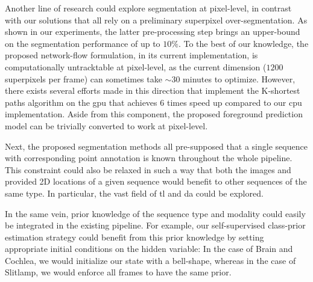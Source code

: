 Another line of research could explore segmentation at pixel-level, in contrast with our solutions that all rely on a preliminary superpixel over-segmentation.
As shown in our experiments, the latter pre-processing step brings an upper-bound on the segmentation performance of up to $10\%$.
To the best of our knowledge, the proposed network-flow formulation, in its current implementation, is computationally untracktable at pixel-level, as the current dimension ($1200$ superpixels per frame) can sometimes take $\sim 30$ minutes to optimize.
However, there exists several efforts made in this direction that implement the K-shortest paths algorithm on the \gls{gpu} that achieves $6$ times speed up compared to our \gls{cpu} implementation.
Aside from this component, the proposed foreground prediction model can be trivially converted to work at pixel-level.

Next, the proposed segmentation methods all pre-supposed that a single sequence with corresponding point annotation is known throughout the whole pipeline.
This constraint could also be relaxed in such a way that both the images and provided 2D locations of a given sequence would benefit to other sequences of the same type.
In particular, the vast field of \gls{tl} and \gls{da} could be explored.

In the same vein, prior knowledge of the sequence type and modality could easily be integrated in the existing pipeline.
For example, our self-supervised class-prior estimation strategy could benefit from this prior knowledge by setting appropriate initial conditions on the hidden variable: In the case of Brain and Cochlea, we would initialize our state with a bell-shape, whereas in the case of Slitlamp, we would enforce all frames to have the same prior.


